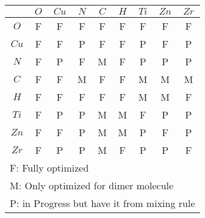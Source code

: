 \documentclass[10pt]{article}
\begin{document}
\begin{table}[h]
\begin{tabular}{|c|c|c|c|c|c|c|c|c|}
\hline
   & $O$ & $Cu$ & $N$ & $C$ & $H$ & $Ti$ & $Zn$ & $Zr$ \\ \hline
$O$	& F & F & F & F & F & F & F & F\\ \hline
$Cu$	& F & F & P & F & F & P & F & P \\ \hline
$N$ 	& F & P & F & M & F & P & P & P \\ \hline
$C$   	& F & F & M & F & F & M & M & M \\ \hline
$H$   	& F & F & F & F & F & M & M & F \\ \hline
$Ti$   	& F & P & P & M & M & F & P & P \\ \hline
$Zn$  	& F & F & P & M & M & P & F & P \\ \hline
$Zr$  	& F & P & P & M & F & P & P & F \\ \hline
\multicolumn{9}{l}{F: Fully optimized} \\
\multicolumn{9}{l}{M: Only optimized for dimer molecule} \\
\multicolumn{9}{l}{P: in Progress but have it from mixing rule} \\
\end{tabular}
\end{table}
\end{document}
